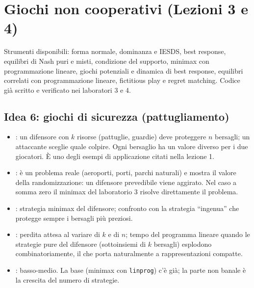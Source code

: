 \documentclass[11pt, a4paper, oneside, openany]{book}
\newcommand{\stato}[2]{\etichetta{#1}{#2}}
\newcommand{\sbloccata}[1]{\stato{blu}{DA LEZIONE #1}}
\begin{document}
\section{Giochi non cooperativi (Lezioni 3 e 4)}

Strumenti disponibili: forma normale, dominanza e IESDS, best response, equilibri di Nash
puri e misti, condizione del supporto, minimax con programmazione lineare, giochi
potenziali e dinamica di best response, equilibri correlati con programmazione lineare,
fictitious play e regret matching. Codice già scritto e verificato nei laboratori 3 e 4.

\subsection*{Idea 6: giochi di sicurezza (pattugliamento) \hfill\sbloccata{3}}
\begin{itemize}
  \item {}: un difensore con $k$ risorse (pattuglie, guardie) deve proteggere $n$
        bersagli; un attaccante sceglie quale colpire. Ogni bersaglio ha un valore diverso
        per i due giocatori. È uno degli esempi di applicazione citati nella lezione 1.
  \item {}: è un problema reale (aeroporti, porti, parchi naturali)
        e mostra il valore della randomizzazione: un difensore prevedibile viene aggirato.
        Nel caso a somma zero il minimax del laboratorio 3 risolve direttamente il problema.
  \item {}: strategia minimax del difensore; confronto con la
        strategia ``ingenua'' che protegge sempre i bersagli più preziosi.
  \item {}: perdita attesa al variare di $k$ e di $n$; tempo del programma
        lineare quando le strategie pure del difensore (sottoinsiemi di $k$ bersagli)
        esplodono combinatoriamente, il che porta naturalmente a rappresentazioni compatte.
  \item {}: basso-medio. La base (minimax con \texttt{linprog}) c'è già; la parte
        non banale è la crescita del numero di strategie.
\end{itemize}
\end{document}
